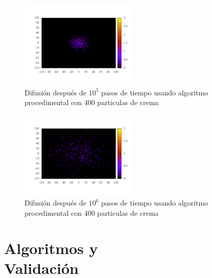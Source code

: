 \documentclass[12pt,twocolumn]{article}
\begin{document}
\begin{figure}
    \centering
    \includegraphics[width=0.5\textwidth]{figs/t_1e5.png}
    \caption{Difusión después de $10^5$ pasos de tiempo usando 
        algoritmo procedimental con 400 particulas de crema}
    \label{fig:t1e5}
\end{figure}

\begin{figure}
    \centering
    \includegraphics[width=0.5\textwidth]{figs/t_1e6.png}
    \caption{Difusión después de $10^6$ pasos de tiempo usando 
        algoritmo procedimental con 400 particulas de crema}
    \label{fig:t1e6}
\end{figure}

\section{Algoritmos y \\ Validación}
\end{document}
